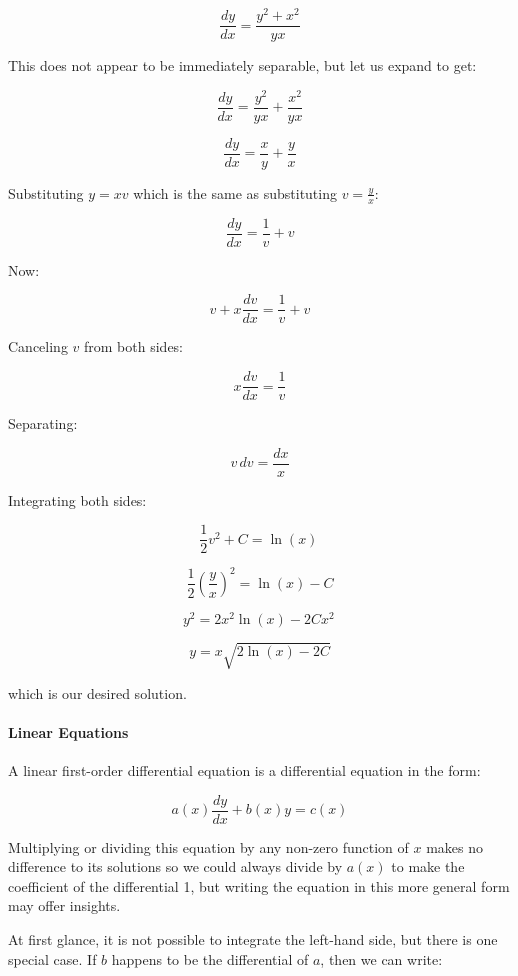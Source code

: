 $$\frac{dy}{dx} = \frac{y^2 + x^2}{yx}$$



This does not appear to be immediately separable, but let us expand to get:

$$\frac{dy}{dx} = \frac{y^2}{yx} + \frac{x^2}{yx}$$

$$\frac{dy}{dx} = \frac{x}{y} + \frac{y}{x}$$



Substituting $y = xv$ which is the same as substituting $v = \frac{y}{x}$:

$$\frac{dy}{dx} = \frac{1}{v} + v$$



Now:

$$v + x\frac{dv}{dx} = \frac{1}{v} + v$$



Canceling $v$ from both sides:

$$x\frac{dv}{dx} = \frac{1}{v}$$



Separating:

$$v\, dv = \frac{dx}{x}$$



Integrating both sides:

$$\frac{1}{2}v^2 + C = \ln(x) \,$$

$$\frac{1}{2}\left(\frac{y}{x}\right)^2 = \ln(x) - C$$

$$y^2 = 2x^2 \ln(x) - 2Cx^2 \,$$

$$y = x\sqrt{2 \ln(x) - 2C}$$



which is our desired solution.



\paragraph{Linear Equations}

A linear first-order differential equation is a differential equation in the form:

$$a(x)\frac{dy}{dx} + b(x)y = c(x)$$



Multiplying or dividing this equation by any non-zero function of $x$ makes no difference to its solutions so we could always divide by $a(x)$ to make the coefficient of the differential 1, but writing the equation in this more general form may offer insights.



At first glance, it is not possible to integrate the left-hand side, but there is one special case. If $b$ happens to be the differential of $a$, then we can write:



